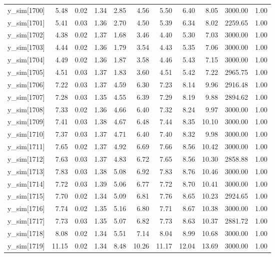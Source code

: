 \begin{table}[ht]
\begin{tabular}{rrrrrrrrrrr}
  y\_sim[1700] & 5.48 & 0.02 & 1.34 & 2.85 & 4.56 & 5.50 & 6.40 & 8.05 & 3000.00 & 1.00 \\ 
  y\_sim[1701] & 5.41 & 0.03 & 1.36 & 2.70 & 4.50 & 5.39 & 6.34 & 8.02 & 2259.65 & 1.00 \\ 
  y\_sim[1702] & 4.38 & 0.02 & 1.37 & 1.68 & 3.46 & 4.40 & 5.30 & 7.03 & 3000.00 & 1.00 \\ 
  y\_sim[1703] & 4.44 & 0.02 & 1.36 & 1.79 & 3.54 & 4.43 & 5.35 & 7.06 & 3000.00 & 1.00 \\ 
  y\_sim[1704] & 4.49 & 0.02 & 1.36 & 1.87 & 3.58 & 4.46 & 5.43 & 7.15 & 3000.00 & 1.00 \\ 
  y\_sim[1705] & 4.51 & 0.03 & 1.37 & 1.83 & 3.60 & 4.51 & 5.42 & 7.22 & 2965.75 & 1.00 \\ 
  y\_sim[1706] & 7.22 & 0.03 & 1.37 & 4.59 & 6.30 & 7.23 & 8.14 & 9.96 & 2916.48 & 1.00 \\ 
  y\_sim[1707] & 7.28 & 0.03 & 1.35 & 4.55 & 6.39 & 7.29 & 8.19 & 9.88 & 2894.62 & 1.00 \\ 
  y\_sim[1708] & 7.33 & 0.02 & 1.36 & 4.66 & 6.40 & 7.32 & 8.24 & 9.97 & 3000.00 & 1.00 \\ 
  y\_sim[1709] & 7.41 & 0.03 & 1.38 & 4.67 & 6.48 & 7.44 & 8.35 & 10.10 & 3000.00 & 1.00 \\ 
  y\_sim[1710] & 7.37 & 0.03 & 1.37 & 4.71 & 6.40 & 7.40 & 8.32 & 9.98 & 3000.00 & 1.00 \\ 
  y\_sim[1711] & 7.65 & 0.02 & 1.37 & 4.92 & 6.69 & 7.66 & 8.56 & 10.42 & 3000.00 & 1.00 \\ 
  y\_sim[1712] & 7.63 & 0.03 & 1.37 & 4.83 & 6.72 & 7.65 & 8.56 & 10.30 & 2858.88 & 1.00 \\ 
  y\_sim[1713] & 7.83 & 0.03 & 1.38 & 5.08 & 6.92 & 7.83 & 8.76 & 10.46 & 3000.00 & 1.00 \\ 
  y\_sim[1714] & 7.72 & 0.03 & 1.39 & 5.06 & 6.77 & 7.72 & 8.70 & 10.41 & 3000.00 & 1.00 \\ 
  y\_sim[1715] & 7.70 & 0.02 & 1.34 & 5.09 & 6.81 & 7.76 & 8.65 & 10.23 & 2924.65 & 1.00 \\ 
  y\_sim[1716] & 7.74 & 0.02 & 1.35 & 5.16 & 6.80 & 7.71 & 8.67 & 10.38 & 3000.00 & 1.00 \\ 
  y\_sim[1717] & 7.73 & 0.03 & 1.35 & 5.07 & 6.82 & 7.73 & 8.63 & 10.37 & 2881.72 & 1.00 \\ 
  y\_sim[1718] & 8.08 & 0.02 & 1.34 & 5.51 & 7.14 & 8.04 & 8.99 & 10.68 & 3000.00 & 1.00 \\ 
  y\_sim[1719] & 11.15 & 0.02 & 1.34 & 8.48 & 10.26 & 11.17 & 12.04 & 13.69 & 3000.00 & 1.00 \\ 

\end{tabular}
\end{table}
